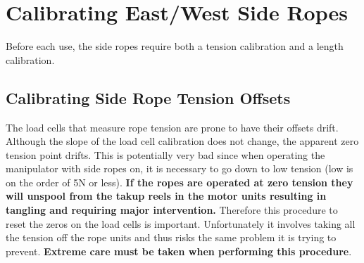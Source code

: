\section{Calibrating East/West Side Ropes}

Before each use, the side ropes require both a tension calibration and a length calibration.

\subsection{Calibrating Side Rope Tension Offsets}
The load cells that measure rope tension are prone to have their offsets drift. Although the slope of the load cell calibration does not change, the apparent zero tension point drifts. This is potentially very bad since when operating the manipulator with side ropes on, it is necessary to go down to low tension (low is on the order of 5N or less).
{\bf If the ropes are operated at zero tension they will unspool from the takup reels in the motor units resulting in tangling and requiring major intervention.}
Therefore this procedure to reset the zeros on the load cells is important. Unfortunately it involves taking all the tension off the rope units and thus risks the same problem it is trying to prevent.
{\bf Extreme care must be taken when performing this procedure}.

